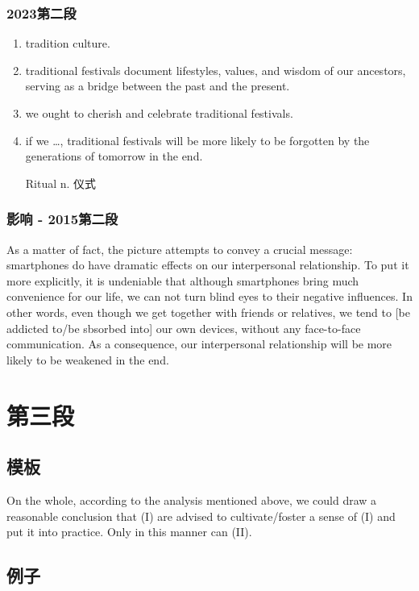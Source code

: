 \subsection{2023第二段}

\begin{enumerate}
    \item tradition culture.
    \item traditional festivals document lifestyles, values, and wisdom
    of our ancestors, serving as a bridge between the past and the present. 
    \item we ought to cherish and celebrate traditional festivals.
    \item if we \dots, traditional festivals will be more likely to be 
    forgotten by the generations of tomorrow in the end.

    Ritual n. 仪式
\end{enumerate}

\subsection{影响 - 2015第二段}

As a matter of fact, the picture
attempts to convey a crucial message:
smartphones do have dramatic effects on our 
interpersonal relationship. 
To put it more explicitly, it is undeniable that 
although smartphones bring much convenience for our life,
we can not turn blind eyes to their negative influences.
In other words, even though we get together with friends or 
relatives, we tend to [be addicted to/be sbsorbed into]
our own devices, without any face-to-face communication. 
As a consequence, our interpersonal relationship will be 
more likely to be weakened in the end.

\chapter{第三段}

\section{模板}

On the whole, according to the analysis mentioned above, we could draw a reasonable 
conclusion that \textrm{(I)} are advised to cultivate/foster a sense of \textrm{(I)}
and put it into practice. Only in this manner can \textrm{(II)}.

\section{例子}

